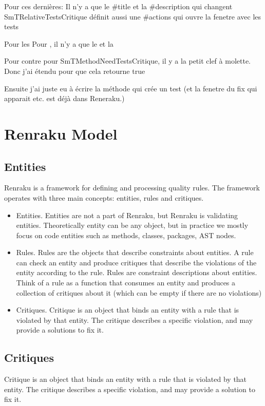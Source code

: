 \documentclass[10pt,twoside,english]{_support/latex/sbabook/sbabook}
\begin{document}
Pour ces derni\`{e}res: Il n'y a que le \#title et la \#description qui changent
SmTRelativeTestsCritique d\'{e}finit aussi une \#actions qui ouvre la fenetre avec les tests

Pour les 
Pour , il n'y a que le  et la 

Pour contre pour SmTMethodNeedTestsCritique, il y a la petit clef \`{a} molette.
Donc j'ai \'{e}tendu  pour que cela retourne true

Ensuite j'ai juste eu \`{a} \'{e}crire la m\'{e}thode qui cr\'{e}e un test (et la fenetre du fix qui apparait etc. est d\'{e}j\`{a} dans Reneraku.)

\chapter{Renraku Model}
\section{Entities}
Renraku is a framework for defining and processing quality rules. The framework operates with three main concepts: entities, rules and critiques.

\begin{itemize}
    \item Entities. Entities are not a part of Renraku, but Renraku is validating entities. Theoretically entity can be any object, but in practice we mostly focus on code entities such as methods, classes, packages, AST nodes.
    \item Rules. Rules are the objects that describe constraints about entities. A rule can check an entity and produce critiques that describe the violations of the entity according to the rule. Rules are constraint descriptions about entities. Think of a rule as a function that consumes an entity and produces a collection of critiques about it (which can be empty if there are no violations)
    \item Critiques. Critique is an object that binds an entity with a rule that is violated by that entity. The critique describes a specific violation, and may provide a solutions to fix it.
\end{itemize}

\section{Critiques}
Critique is an object that binds an entity with a rule that is violated by that entity. The critique describes a specific violation, and may provide a solution to fix it.
\end{document}
